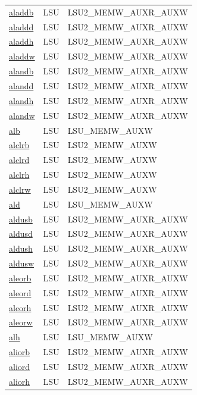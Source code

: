\begin{small}
\begin{longtable}[l]{l l l}
\hyperlink{lvx.aladdb}{aladdb} & LSU & LSU2\_MEMW\_AUXR\_AUXW \\ 
\hyperlink{lvx.aladdd}{aladdd} & LSU & LSU2\_MEMW\_AUXR\_AUXW \\ 
\hyperlink{lvx.aladdh}{aladdh} & LSU & LSU2\_MEMW\_AUXR\_AUXW \\ 
\hyperlink{lvx.aladdw}{aladdw} & LSU & LSU2\_MEMW\_AUXR\_AUXW \\ 
\hyperlink{lvx.alandb}{alandb} & LSU & LSU2\_MEMW\_AUXR\_AUXW \\ 
\hyperlink{lvx.alandd}{alandd} & LSU & LSU2\_MEMW\_AUXR\_AUXW \\ 
\hyperlink{lvx.alandh}{alandh} & LSU & LSU2\_MEMW\_AUXR\_AUXW \\ 
\hyperlink{lvx.alandw}{alandw} & LSU & LSU2\_MEMW\_AUXR\_AUXW \\ 
\hyperlink{lvx.alb}{alb} & LSU & LSU\_MEMW\_AUXW \\ 
\hyperlink{lvx.alclrb}{alclrb} & LSU & LSU2\_MEMW\_AUXW \\ 
\hyperlink{lvx.alclrd}{alclrd} & LSU & LSU2\_MEMW\_AUXW \\ 
\hyperlink{lvx.alclrh}{alclrh} & LSU & LSU2\_MEMW\_AUXW \\ 
\hyperlink{lvx.alclrw}{alclrw} & LSU & LSU2\_MEMW\_AUXW \\ 
\hyperlink{lvx.ald}{ald} & LSU & LSU\_MEMW\_AUXW \\ 
\hyperlink{lvx.aldusb}{aldusb} & LSU & LSU2\_MEMW\_AUXR\_AUXW \\ 
\hyperlink{lvx.aldusd}{aldusd} & LSU & LSU2\_MEMW\_AUXR\_AUXW \\ 
\hyperlink{lvx.aldush}{aldush} & LSU & LSU2\_MEMW\_AUXR\_AUXW \\ 
\hyperlink{lvx.aldusw}{aldusw} & LSU & LSU2\_MEMW\_AUXR\_AUXW \\ 
\hyperlink{lvx.aleorb}{aleorb} & LSU & LSU2\_MEMW\_AUXR\_AUXW \\ 
\hyperlink{lvx.aleord}{aleord} & LSU & LSU2\_MEMW\_AUXR\_AUXW \\ 
\hyperlink{lvx.aleorh}{aleorh} & LSU & LSU2\_MEMW\_AUXR\_AUXW \\ 
\hyperlink{lvx.aleorw}{aleorw} & LSU & LSU2\_MEMW\_AUXR\_AUXW \\ 
\hyperlink{lvx.alh}{alh} & LSU & LSU\_MEMW\_AUXW \\ 
\hyperlink{lvx.aliorb}{aliorb} & LSU & LSU2\_MEMW\_AUXR\_AUXW \\ 
\hyperlink{lvx.aliord}{aliord} & LSU & LSU2\_MEMW\_AUXR\_AUXW \\ 
\hyperlink{lvx.aliorh}{aliorh} & LSU & LSU2\_MEMW\_AUXR\_AUXW \\ 

\end{longtable}
\end{small}
